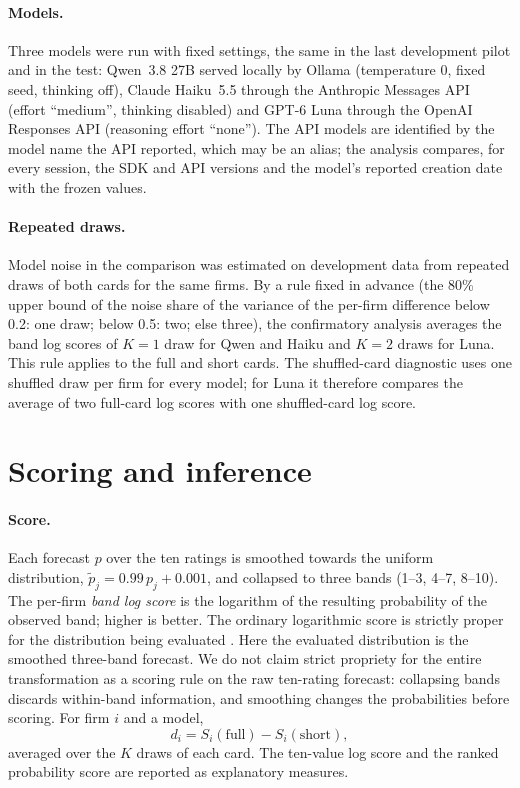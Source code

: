 \documentclass[11pt]{article}
\begin{document}
\paragraph{Models.} Three models were run with fixed settings, the same in the last development pilot and in the test:
Qwen~3.8 27B served locally by Ollama (temperature 0, fixed seed, thinking off), Claude Haiku~5.5 through the
Anthropic Messages API (effort ``medium'', thinking disabled) and GPT-6 Luna through the OpenAI Responses API
(reasoning effort ``none''). The API models are identified by the model name the API reported, which may be an alias;
the analysis compares, for every session, the SDK and API versions and the model's reported creation date with the
frozen values.

\paragraph{Repeated draws.} Model noise in the comparison was estimated on development data from repeated draws of
both cards for the same firms. By a rule fixed in advance (the 80\% upper bound of the noise share of the variance of
the per-firm difference below 0.2: one draw; below 0.5: two; else three), the confirmatory analysis averages the band
log scores of $K=1$ draw for Qwen and Haiku and $K=2$ draws for Luna. This rule applies to the full and short cards.
The shuffled-card diagnostic uses one shuffled draw per firm for every model; for Luna it therefore compares the
average of two full-card log scores with one shuffled-card log score.

\section{Scoring and inference}
\label{sec:inference}

\paragraph{Score.} Each forecast $p$ over the ten ratings is smoothed towards the uniform distribution,
$\tilde p_j=0.99\,p_j+0.001$, and collapsed to three bands (1--3, 4--7, 8--10). The per-firm
\emph{band log score} is the logarithm of the resulting probability of the observed band; higher is better.
The ordinary logarithmic score is strictly proper for the distribution being evaluated \citep{gneiting2007}.
Here the evaluated distribution is the smoothed three-band forecast. We do not claim strict propriety for the
entire transformation as a scoring rule on the raw ten-rating forecast: collapsing bands discards within-band
information, and smoothing changes the probabilities before scoring. For firm $i$ and a model,
\begin{equation}
d_i = S_i(\text{full}) - S_i(\text{short}),
\end{equation}
averaged over the $K$ draws of each card. The ten-value log score and the ranked probability score \citep{epstein1969}
are reported as explanatory measures.
\end{document}
